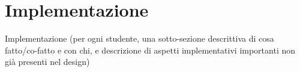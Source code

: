 \section{Implementazione}
Implementazione (per ogni studente, una sotto-sezione descrittiva di cosa fatto/co-fatto e con chi, e descrizione di aspetti implementativi importanti non già presenti nel design)